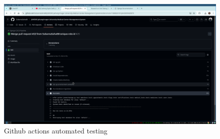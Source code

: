 \documentclass[a4paper,12pt]{article}
\begin{document}
\begin{figure}[H]
    \centering
    \includegraphics[width=1\textwidth]{images/TDD4.png}
    \caption{Github actions automated testing}
    \label{fig:tdd4}
\end{figure}
\end{document}
